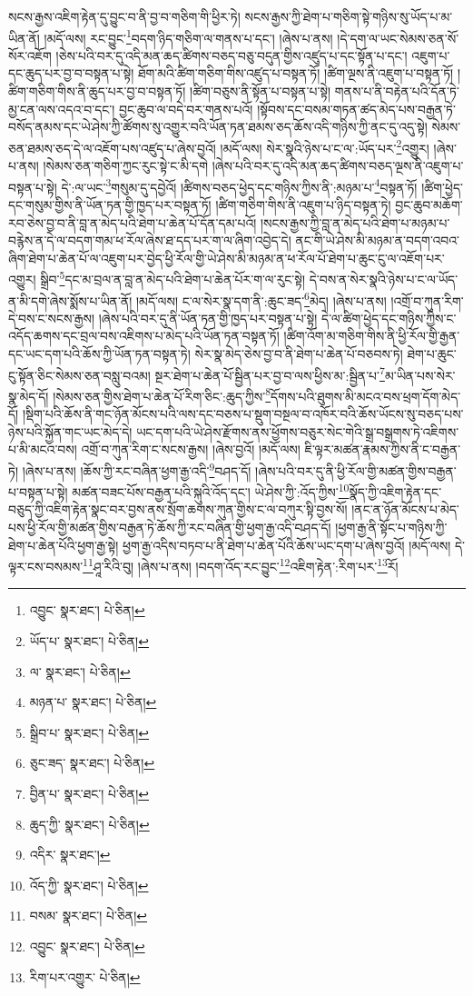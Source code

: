 སངས་རྒྱས་འཇིག་རྟེན་དུ་བྱུང་བ་ནི་བྱ་བ་གཅིག་གི་ཕྱིར་ཏེ། སངས་རྒྱས་ཀྱི་ཐེག་པ་གཅིག་སྟེ་གཉིས་སུ་ཡོད་པ་མ་ཡིན་ནོ། །མདོ་ལས། རང་བྱུང་\footnote{འབྱུང་  སྣར་ཐང་།  པེ་ཅིན། }བདག་ཉིད་གཅིག་ལ་གནས་པ་དང་། །ཞེས་པ་ནས། །དེ་དག་ལ་ཡང་སེམས་ཅན་སོ་སོར་འཇོག །ཅེས་པའི་བར་དུ་འདི་མན་ཆད་ཚིགས་བཅད་བཅུ་བདུན་གྱིས་འཛུད་པ་དང་སྟོན་པ་དང་། འཇུག་པ་དང་ཆུད་པར་བྱ་བ་བསྟན་པ་སྟེ། ཐོག་མའི་ཚིག་གཅིག་གིས་འཛུད་པ་བསྟན་ཏོ། །ཚིག་ལྔས་ནི་འཇུག་པ་བསྟན་ཏོ། །ཚིག་གཅིག་གིས་ནི་ཆུད་པར་བྱ་བ་བསྟན་ཏོ། །ཚིག་བཅུས་ནི་སྟོན་པ་བསྟན་པ་སྟེ། གནས་པ་ནི་བརྟེན་པའི་དོན་ཏེ་མྱ་ངན་ལས་འདའ་བ་དང་། བྱང་ཆུབ་ལ་བདེ་བར་གནས་པའོ། །སྟོབས་དང་བསམ་གཏན་ཚད་མེད་པས་བརྒྱན་ཏེ་བསོད་ནམས་དང་ཡེ་ཤེས་ཀྱི་ཚོགས་སུ་འགྱུར་བའི་ཡོན་ཏན་ཐམས་ཅད་ཆོས་འདི་གཉིས་ཀྱི་ནང་དུ་འདུ་སྟེ། སེམས་ཅན་ཐམས་ཅད་དེ་ལ་འཇོག་པས་འཛུད་པ་ཞེས་བྱའོ། །མདོ་ལས། སེར་སྣའི་ཉེས་པ་ང་ལ་:ཡོད་པར་\footnote{ཡོད་པ་  སྣར་ཐང་།  པེ་ཅིན། }འགྱུར། །ཞེས་པ་ནས། །སེམས་ཅན་གཅིག་ཀྱང་རུང་སྟེ་ང་མི་དགེ །ཞེས་པའི་བར་དུ་འདི་མན་ཆད་ཚིགས་བཅད་ལྔས་ནི་འཇུག་པ་བསྟན་པ་སྟེ། དེ་:ལ་ཡང་\footnote{ལ་  སྣར་ཐང་།  པེ་ཅིན། }གསུམ་དུ་དབྱེའོ། །ཚིགས་བཅད་ཕྱེད་དང་གཉིས་ཀྱིས་ནི་:མཉམ་པ་\footnote{མཉན་པ་  སྣར་ཐང་།  པེ་ཅིན། }བསྟན་ཏོ། །ཚིག་ཕྱེད་དང་གསུམ་གྱིས་ནི་ཡོན་ཏན་གྱི་ཁྱད་པར་བསྟན་ཏོ། །ཚིག་གཅིག་གིས་ནི་འཇུག་པ་ཉིད་བསྟན་ཏེ། བྱང་ཆུབ་མཆོག་རབ་ཅེས་བྱ་བ་ནི་བླ་ན་མེད་པའི་ཐེག་པ་ཆེན་པོ་དོན་དམ་པའོ། །སངས་རྒྱས་ཀྱི་བླ་ན་མེད་པའི་ཐེག་པ་མཉམ་པ་བརྙེས་ན་དེ་ལ་བདག་གམ་ཕ་རོལ་ཞེས་ཐ་དད་པར་ག་ལ་ཞིག་འབྱེད་དེ། ནང་གི་ཡེ་ཤེས་མི་མཉམ་ན་བདག་འབའ་ཞིག་ཐེག་པ་ཆེན་པོ་ལ་འཇུག་པར་བྱེད་ཕྱི་རོལ་གྱི་ཡེ་ཤེས་མི་མཉམ་ན་ཕ་རོལ་པོ་ཐེག་པ་ཆུང་ངུ་ལ་འཇོག་པར་འགྱུར། སྒྲིབ་\footnote{སྒྲིབ་པ་  སྣར་ཐང་།  པེ་ཅིན། }དང་མ་བྲལ་ན་བླ་ན་མེད་པའི་ཐེག་པ་ཆེན་པོར་ག་ལ་རུང་སྟེ། དེ་བས་ན་སེར་སྣའི་ཉེས་པ་ང་ལ་ཡོད་ན་མི་དགེ་ཞེས་སྨོས་པ་ཡིན་ནོ། །མདོ་ལས། ང་ལ་སེར་སྣ་དག་ནི་:ཆུང་ཟད་\footnote{ཅུང་ཟད་  སྣར་ཐང་།  པེ་ཅིན། }མེད། །ཞེས་པ་ནས། །འགྲོ་བ་ཀུན་རིག་དེ་བས་ང་སངས་རྒྱས། །ཞེས་པའི་བར་དུ་ནི་ཡོན་ཏན་གྱི་ཁྱད་པར་བསྟན་པ་སྟེ། དེ་ལ་ཚིག་ཕྱེད་དང་གཉིས་ཀྱིས་ང་འདོད་ཆགས་དང་བྲལ་བས་འཇིགས་པ་མེད་པའི་ཡོན་ཏན་བསྟན་ཏོ། །ཚིག་འོག་མ་གཅིག་གིས་ནི་ཕྱི་རོལ་གྱི་རྒྱན་དང་ཡང་དག་པའི་ཆོས་ཀྱི་ཡོན་ཏན་བསྟན་ཏེ། སེར་སྣ་མེད་ཅེས་བྱ་བ་ནི་ཐེག་པ་ཆེན་པོ་བཅབས་ཏེ། ཐེག་པ་ཆུང་ངུ་སྟོན་ཅིང་སེམས་ཅན་བསླུ་བའམ། སྔར་ཐེག་པ་ཆེན་པོ་སྦྱིན་པར་བྱ་བ་ལས་ཕྱིས་མ་:སྦྱིན་པ་\footnote{བྱིན་པ་  སྣར་ཐང་།  པེ་ཅིན། }མ་ཡིན་པས་སེར་སྣ་མེད་དོ། །སེམས་ཅན་གྱིས་ཐེག་པ་ཆེན་པོ་རིག་ཅིང་:ཆུད་ཀྱིས་\footnote{ཆུད་ཀྱི་  སྣར་ཐང་།  པེ་ཅིན། }དོགས་པའི་ཐུགས་མི་མངའ་བས་ཕྲག་དོག་མེད་དོ། །སྡིག་པའི་ཆོས་ནི་གང་ཉོན་མོངས་པའི་ལས་དང་བཅས་པ་སྡུག་བསྔལ་བ་འཁོར་བའི་ཆོས་ཡོངས་སུ་བཅད་པས་ཉེས་པའི་སྐྱོན་གང་ཡང་མེད་དེ། ཡང་དག་པའི་ཡེ་ཤེས་རྫོགས་ནས་ཕྱོགས་བཅུར་སེང་གེའི་སྒྲ་བསྒྲགས་ཏེ་འཇིགས་པ་མི་མངའ་བས། འགྲོ་བ་ཀུན་རིག་ང་སངས་རྒྱས། །ཞེས་བྱའོ། །མདོ་ལས། ཇི་ལྟར་མཚན་རྣམས་ཀྱིས་ནི་ང་བརྒྱན་ཏེ། །ཞེས་པ་ནས། །ཆོས་ཀྱི་རང་བཞིན་ཕྱག་རྒྱ་འདི་\footnote{འདིར་  སྣར་ཐང་། }བཤད་དོ། །ཞེས་པའི་བར་དུ་ནི་ཕྱི་རོལ་གྱི་མཚན་གྱིས་བརྒྱན་པ་བསྟན་པ་སྟེ། མཚན་བཟང་པོས་བརྒྱན་པའི་སྐུའི་འོད་དང་། ཡེ་ཤེས་ཀྱི་:འོད་ཀྱིས་\footnote{འོད་ཀྱི་  སྣར་ཐང་།  པེ་ཅིན། }སྣོད་ཀྱི་འཇིག་རྟེན་དང་བཅུད་ཀྱི་འཇིག་རྟེན་སྣང་བར་བྱས་ནས་སྲོག་ཆགས་ཀུན་གྱིས་ང་ལ་བཀུར་སྟི་བྱས་སོ། །ནང་ན་ཉོན་མོངས་པ་མེད་པས་ཕྱི་རོལ་གྱི་མཚན་གྱིས་བརྒྱན་ཏེ་ཆོས་ཀྱི་རང་བཞིན་གྱི་ཕྱག་རྒྱ་འདི་བཤད་དོ། །ཕྱག་རྒྱ་ནི་སྟོང་པ་གཉིས་ཀྱི་ཐེག་པ་ཆེན་པོའི་ཕྱག་རྒྱ་སྟེ། ཕྱག་རྒྱ་འདིས་བཏབ་པ་ནི་ཐེག་པ་ཆེན་པོའི་ཆོས་ཡང་དག་པ་ཞེས་བྱའོ། །མདོ་ལས། དེ་ལྟར་ངས་བསམས་\footnote{བསམ་  སྣར་ཐང་།  པེ་ཅིན། }ཤཱ་རིའི་བུ། །ཞེས་པ་ནས། །བདག་འོད་རང་བྱུང་\footnote{འབྱུང་  སྣར་ཐང་།  པེ་ཅིན། }འཇིག་རྟེན་:རིག་པར་\footnote{རིག་པར་འགྱུར་  པེ་ཅིན། }རོ། 